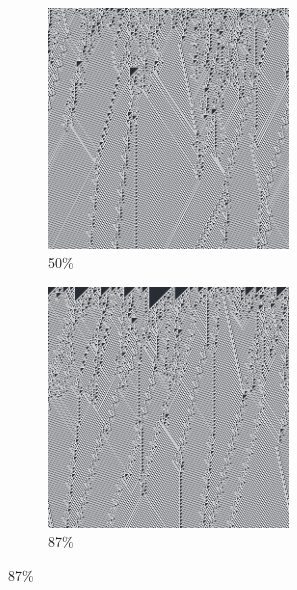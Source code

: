 \documentclass[12pt, fleqn]{report}                             %
\theoremstyle{break}                                            %
\begin{document}
\begin{figure}[h!]
\begin{subfigure}[b]{0.4\linewidth}
            \includegraphics[width=0.7\textwidth]{Images/110/c.png}
            \caption{50\%}
          \end{subfigure}
          \begin{subfigure}[b]{0.4\linewidth}
            \includegraphics[width=0.7\textwidth]{Images/110/d.png}
            \caption{87\%}
          \end{subfigure}
        \end{figure}
\end{document}

